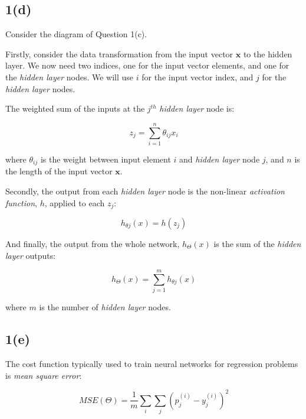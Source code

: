 \documentclass[12pt, a4paper,reqno]{article}
\begin{document}
\subsection*{1(d)}
Consider the diagram of Question 1(c).

Firstly, consider the data transformation from the input vector $\mathbf{x}$ to the hidden layer. We now need two indices, one for the input vector elements, and one for the \emph{hidden layer} nodes. We will use $i$ for the input vector index, and $j$ for the \emph{hidden layer} nodes.

The weighted sum of the inputs at the $j^{th}$ \emph{hidden layer} node is:

\begin{equation}
z_j = \sum_{i=1}^{n}\theta_{ij} x_i
\end{equation}

where $\theta_{ij}$ is the weight between input element $i$ and \emph{hidden layer} node $j$, and $n$ is the length of the input vector $\mathbf{x}$.

Secondly, the output from each \emph{hidden layer} node is the non-linear \emph{activation function}, $h$, applied to each $z_j$:

\begin{equation}
h_{\theta j}(x) = h(z_j)
\end{equation}

 And finally, the output from the whole network, $h_\Theta(x)$ is the sum of the \emph{hidden layer} outputs:
 
\begin{equation}
h_\Theta(x) = \sum_{j=1}^{m}h_{\theta j}(x)
\end{equation}

where $m$ is the number of \emph{hidden layer} nodes.



\subsection*{1(e)}

The cost function typically used to train neural networks for regression problems is \emph{mean square error}:

\begin{equation}
MSE(\Theta) = \frac{1}{m}\sum_{i}\sum_{j}(p_j^{(i)} - y_j^{(i)})^2
\end{equation}
\end{document}
